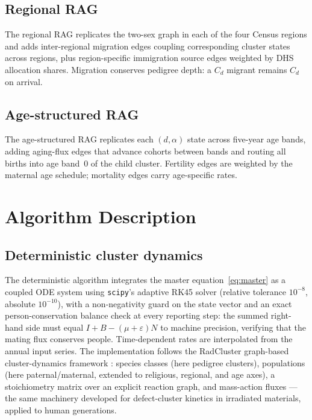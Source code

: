 \documentclass[11pt,a4paper]{article}
\begin{document}
\subsection{Regional RAG}
\label{sec:rag-regional}
The regional RAG replicates the two-sex graph in each of the four
Census regions and adds inter-regional migration edges coupling
corresponding cluster states across regions, plus region-specific
immigration source edges weighted by DHS allocation shares.  Migration
conserves pedigree depth: a $C_d$ migrant remains $C_d$ on arrival.

\subsection{Age-structured RAG}
\label{sec:rag-age}
The age-structured RAG replicates each $(d,\alpha)$ state across
five-year age bands, adding aging-flux edges that advance cohorts
between bands and routing all births into age band~0 of the child
cluster.  Fertility edges are weighted by the maternal age schedule;
mortality edges carry age-specific rates.

\section{Algorithm Description}
\label{sec:algorithms}

\subsection{Deterministic cluster dynamics}
\label{sec:det}
The deterministic algorithm integrates the master
equation~\eqref{eq:master} as a coupled ODE system using
\texttt{scipy}'s adaptive RK45 solver (relative tolerance $10^{-8}$,
absolute $10^{-10}$), with a non-negativity guard on the state vector
and an exact person-conservation balance check at every reporting
step: the summed right-hand side must equal
$I+B-(\mu+\varepsilon)N$ to machine precision, verifying that the
mating flux conserves people.  Time-dependent rates are interpolated
from the annual input series.  The implementation follows the
RadCluster graph-based cluster-dynamics framework \cite{radcluster}:
species classes (here pedigree clusters), populations (here
paternal/maternal, extended to religious, regional, and age axes), a
stoichiometry matrix over an explicit reaction graph, and mass-action
fluxes --- the same machinery developed for defect-cluster kinetics in
irradiated materials, applied to human generations.
\end{document}
